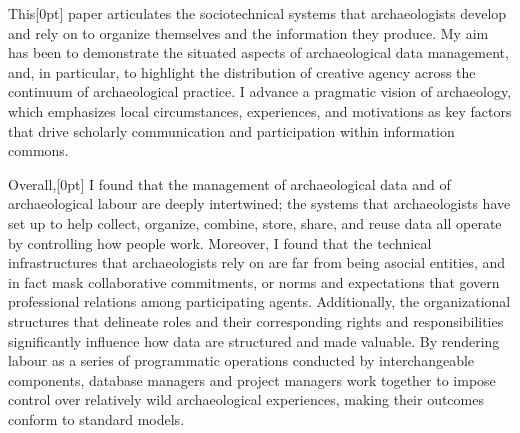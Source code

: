 \documentclass[
]{article}
\newcommand{\paragraphnumber}[1]{\marginnote{\color{lightgray}\tiny{#1}}[0pt]}
\begin{document}
This\paragraphnumber{[77]} paper articulates the sociotechnical systems
that archaeologists develop and rely on to organize themselves and the
information they produce. My aim has been to demonstrate the situated
aspects of archaeological data management, and, in particular, to
highlight the distribution of creative agency across the continuum of
archaeological practice. I advance a pragmatic vision of archaeology,
which emphasizes local circumstances, experiences, and motivations as
key factors that drive scholarly communication and participation within
information commons.

Overall,\paragraphnumber{[78]} I found that the management of
archaeological data and of archaeological labour are deeply intertwined;
the systems that archaeologists have set up to help collect, organize,
combine, store, share, and reuse data all operate by controlling how
people work. Moreover, I found that the technical infrastructures that
archaeologists rely on are far from being asocial entities, and in fact
mask collaborative commitments, or norms and expectations that govern
professional relations among participating agents. Additionally, the
organizational structures that delineate roles and their corresponding
rights and responsibilities significantly influence how data are
structured and made valuable. By rendering labour as a series of
programmatic operations conducted by interchangeable components,
database managers and project managers work together to impose control
over relatively wild archaeological experiences, making their outcomes
conform to standard models.
\end{document}
